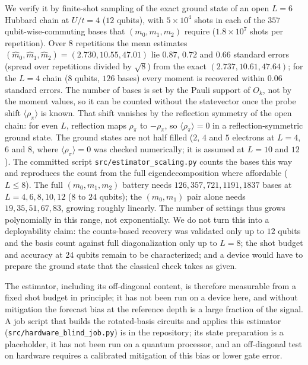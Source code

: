 \documentclass[submission, PhysCore]{SciPost}
\begin{document}
\begin{appendix}
We verify it by finite-shot sampling of the exact ground state of an open $L=6$ Hubbard chain at $U/t=4$ ($12$ qubits), with $5\times10^4$ shots in each of the $357$ qubit-wise-commuting bases that $(m_0,m_1,m_2)$ require ($1.8\times10^7$ shots per repetition). Over $8$ repetitions the mean estimates $(\widehat m_0,\widehat m_1,\widehat m_2)=(2.730,10.55,47.01)$ lie $0.87$, $0.72$ and $0.66$ standard errors (spread over repetitions divided by $\sqrt8$) from the exact $(2.737,10.61,47.64)$; for the $L=4$ chain ($8$ qubits, $126$ bases) every moment is recovered within $0.06$ standard errors. The number of bases is set by the Pauli support of $O_k$, not by the moment values, so it can be counted without the statevector once the probe shift $\langle\rho_\pi\rangle$ is known. That shift vanishes by the reflection symmetry of the open chain: for even $L$, reflection maps $\rho_\pi$ to $-\rho_\pi$, so $\langle\rho_\pi\rangle=0$ in a reflection-symmetric ground state. The ground states are not half filled ($2$, $4$ and $5$ electrons at $L=4$, $6$ and $8$, where $\langle\rho_\pi\rangle=0$ was checked numerically; it is assumed at $L=10$ and $12$). The committed script \texttt{src/\allowbreak estimator\_scaling.py} counts the bases this way and reproduces the count from the full eigendecomposition where affordable ($L\le8$). The full $(m_0,m_1,m_2)$ battery needs $126,357,721,1191,1837$ bases at $L=4,6,8,10,12$ ($8$ to $24$ qubits); the $(m_0,m_1)$ pair alone needs $19,35,51,67,83$, growing roughly linearly. The number of settings thus grows polynomially in this range, not exponentially. We do not turn this into a deployability claim: the counts-based recovery was validated only up to $12$ qubits and the basis count against full diagonalization only up to $L=8$; the shot budget and accuracy at $24$ qubits remain to be characterized; and a device would have to prepare the ground state that the classical check takes as given.

The estimator, including its off-diagonal content, is therefore measurable from a fixed shot budget in principle; it has not been run on a device here, and without mitigation the forecast bias at the reference depth is a large fraction of the signal. A job script that builds the rotated-basis circuits and applies this estimator (\texttt{src/\allowbreak hardware\_blind\_job.py}) is in the repository; its state preparation is a placeholder, it has not been run on a quantum processor, and an off-diagonal test on hardware requires a calibrated mitigation of this bias or lower gate error.


\end{appendix}
\end{document}

